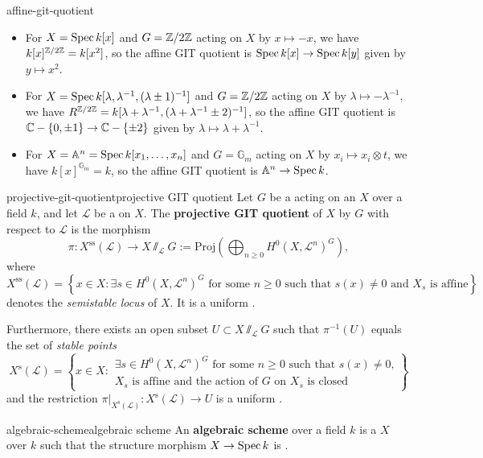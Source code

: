 \begin{example}{affine-git-quotient}
    \begin{itemize}
        \item For $X = \operatorname{Spec} k[x]$ and $G = \mathbb{Z}/2\mathbb{Z}$ acting on $X$ by $x \mapsto -x$, we have $k[x]^{\mathbb{Z}/2\mathbb{Z}} = k[x^2]$, so the affine GIT quotient is $\operatorname{Spec} k[x] \to \operatorname{Spec} k[y]$ given by $y \mapsto x^2$.
        \item For $X = \operatorname{Spec} k[\lambda, \lambda^{-1}, (\lambda \pm 1)^{-1}]$ and $G = \mathbb{Z}/2\mathbb{Z}$ acting on $X$ by $\lambda \mapsto -\lambda^{-1}$, we have $R^{\mathbb{Z}/2\mathbb{Z}} = k[\lambda + \lambda^{-1}, (\lambda + \lambda^{-1} \pm 2)^{-1}]$, so the affine GIT quotient is $\mathbb{C} - \{ 0, \pm 1 \} \to \mathbb{C} - \{ \pm 2 \}$ given by $\lambda \mapsto \lambda + \lambda^{-1}$.
        \item For $X = \mathbb{A}^n = \operatorname{Spec} k[x_1, \ldots, x_n]$ and $G = \mathbb{G}_m$ acting on $X$ by $x_i \mapsto x_i \otimes t$, we have $k[x]^{\mathbb{G}_m} = k$, so the affine GIT quotient is $\mathbb{A}^n \to \operatorname{Spec} k$.
    \end{itemize}
\end{example}

\begin{topic}{projective-git-quotient}{projective GIT quotient}
    Let $G$ be a   acting on an  $X$ over a field $k$, and let $\mathcal{L}$ be a   on $X$. The \textbf{projective GIT quotient} of $X$ by $G$ with respect to $\mathcal{L}$ is the morphism
    \[ \pi : X^\text{ss}(\mathcal{L}) \to X \sslash_\mathcal{L} G := \text{Proj}\left(\bigoplus_{n \ge 0} H^0(X, \mathcal{L}^n)^G \right) , \]
    where
    \[ X^\text{ss}(\mathcal{L}) = \left\{ x \in X : \exists s \in H^0(X, \mathcal{L}^n)^G \text{ for some $n \ge 0$ such that $s(x) \ne 0$ and $X_s$ is affine} \right\} \]
    denotes the \textit{semistable locus} of $X$. It is a uniform .
    
    Furthermore, there exists an open subset $U \subset X \sslash_\mathcal{L} G$ such that $\pi^{-1}(U)$ equals the set of \textit{stable points} \[ X^\text{s}(\mathcal{L}) = \left\{ x \in X : \begin{array}{c} \exists s \in H^0(X, \mathcal{L}^n)^G \text{ for some $n \ge 0$ such that $s(x) \ne 0$,} \\ \text{$X_s$ is affine and the action of $G$ on $X_s$ is closed} \end{array} \right\} \]
    and the restriction $\pi|_{X^\text{s}(\mathcal{L})} : X^\text{s}(\mathcal{L}) \to U$ is a uniform .
\end{topic}

\begin{topic}{algebraic-scheme}{algebraic scheme}
    An \textbf{algebraic scheme} over a field $k$ is a  $X$ over $k$ such that the structure morphism $X \to \operatorname{Spec} k$ is .
\end{topic}
